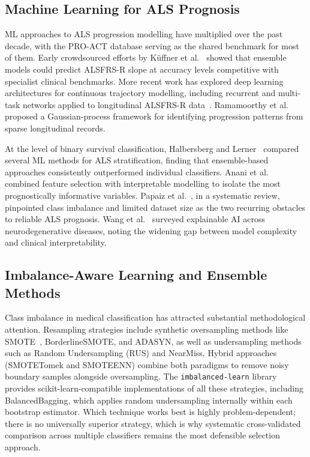 \documentclass[a4paper,twoside]{article}
\begin{document}
\subsection{Machine Learning for ALS Prognosis}

ML approaches to ALS progression modelling have multiplied over the past
decade, with the PRO-ACT database serving as the shared benchmark for most of
them. Early crowdsourced efforts by Küffner et al.~\cite{kueffner2019} showed
that ensemble models could predict ALSFRS-R slope at accuracy levels competitive
with specialist clinical benchmarks. More recent work has explored deep
learning architectures for continuous trajectory modelling, including recurrent
and multi-task networks applied to longitudinal ALSFRS-R
data~\cite{Pancotti2022,Qin2025}. Ramamoorthy et al.~\cite{Ramamoorthy2022}
proposed a Gaussian-process framework for identifying progression patterns from
sparse longitudinal records.

At the level of binary survival classification, Halbersberg and
Lerner~\cite{Halbersberg2023} compared several ML methods for ALS stratification,
finding that ensemble-based approaches consistently outperformed individual
classifiers. Anani et al.~\cite{Anani2023} combined feature selection with
interpretable modelling to isolate the most prognostically informative variables.
Papaiz et al.~\cite{Papaiz2022}, in a systematic review, pinpointed class
imbalance and limited dataset size as the two recurring obstacles to reliable
ALS prognosis. Wang et al.~\cite{Wang2025} surveyed explainable AI across
neurodegenerative diseases, noting the widening gap between model complexity
and clinical interpretability.

\subsection{Imbalance-Aware Learning and Ensemble Methods}

Class imbalance in medical classification has attracted substantial methodological
attention. Resampling strategies include synthetic oversampling methods like
SMOTE~\cite{chawla2002smote}, BorderlineSMOTE, and ADASYN, as well as
undersampling methods such as Random Undersampling (RUS) and NearMiss. Hybrid
approaches (SMOTETomek and SMOTEENN) combine both paradigms to remove noisy
boundary samples alongside oversampling. The \texttt{imbalanced-learn}
library~\cite{lemaitre2017} provides scikit-learn-compatible
implementations of all these strategies, including BalancedBagging, which
applies random undersampling internally within each bootstrap estimator.
Which technique works best is highly problem-dependent; there is no universally
superior strategy, which is why systematic cross-validated comparison across
multiple classifiers remains the most defensible selection approach.
\end{document}
